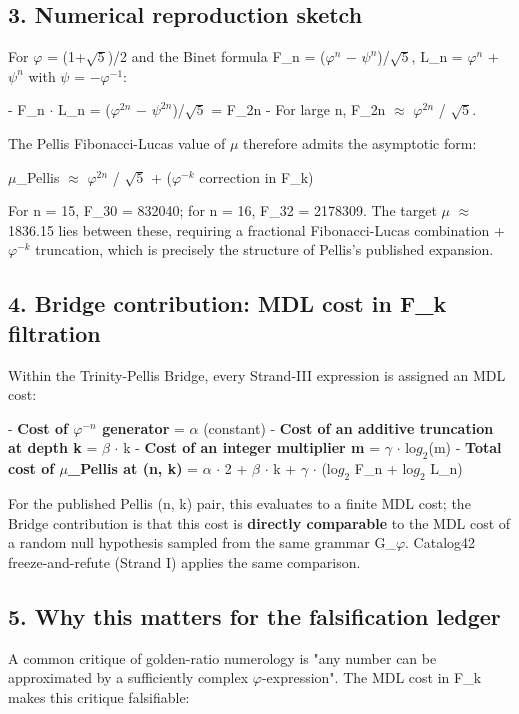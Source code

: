\subsection{3. Numerical reproduction sketch}

For $\varphi$ = (1+$\sqrt{5}$)/2 and the Binet formula F\_n = ($\varphi^{n}$ $-$ $\psi^{n}$)/$\sqrt{5}$, L\_n = $\varphi^{n}$ + $\psi^{n}$ with $\psi$ = $-\varphi^{-1}$:

- F\_n $\cdot$ L\_n = ($\varphi^{2n}$ $-$ $\psi^{2n}$)/$\sqrt{5}$ = F\_{2n}
- For large n, F\_{2n} $\approx$ $\varphi^{2n}$ / $\sqrt{5}$.

The Pellis Fibonacci-Lucas value of $\mu$ therefore admits the asymptotic form:

$\mu$\_Pellis $\approx$ $\varphi^{2n}$ / $\sqrt{5}$ + ($\varphi^{-k}$ correction in F\_k)

For n = 15, F\_{30} = 832040; for n = 16, F\_{32} = 2178309. The target $\mu$ $\approx$ 1836.15 lies between these, requiring a fractional Fibonacci-Lucas combination + $\varphi^{-k}$ truncation, which is precisely the structure of Pellis's published expansion.

\subsection{4. Bridge contribution: MDL cost in F\_k filtration}

Within the Trinity-Pellis Bridge, every Strand-III expression is assigned an MDL cost:

- \textbf{Cost of $\varphi^{-n}$ generator} = $\alpha$ (constant)
- \textbf{Cost of an additive truncation at depth k} = $\beta$ $\cdot$ k
- \textbf{Cost of an integer multiplier m} = $\gamma$ $\cdot$ lo$g_{2}$(m)
- \textbf{Total cost of $\mu$\_Pellis at (n, k)} = $\alpha$ $\cdot$ 2 + $\beta$ $\cdot$ k + $\gamma$ $\cdot$ (lo$g_{2}$ F\_n + lo$g_{2}$ L\_n)

For the published Pellis (n, k) pair, this evaluates to a finite MDL cost; the Bridge contribution is that this cost is \textbf{directly comparable} to the MDL cost of a random null hypothesis sampled from the same grammar G\_$\varphi$. Catalog42 freeze-and-refute (Strand I) applies the same comparison.

\subsection{5. Why this matters for the falsification ledger}

A common critique of golden-ratio numerology is "any number can be approximated by a sufficiently complex $\varphi$-expression". The MDL cost in F\_k makes this critique falsifiable:

